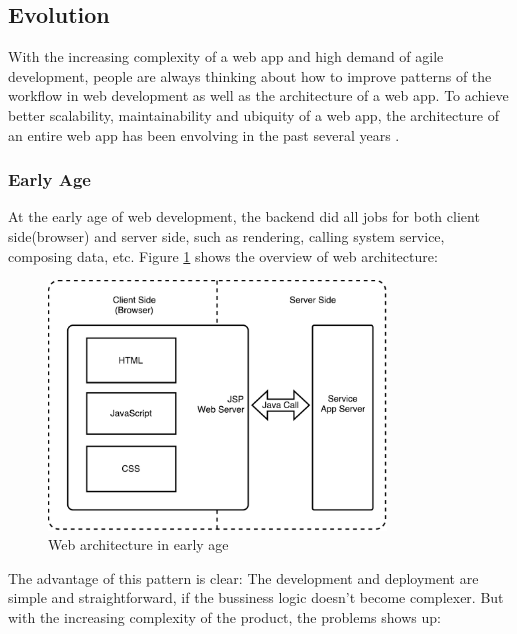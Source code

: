 

\subsection{Evolution}
With the increasing complexity of a web app and high demand of agile development, people are always thinking about how to improve patterns of the workflow in web development as well as the architecture of a web app. To achieve better scalability, maintainability and ubiquity of a web app, the architecture of an entire web app has been envolving in the past several years .

\subsubsection{Early Age}
At the early age of web development, the backend did all jobs for both client side(browser) and server side, such as rendering, calling system service, composing data, etc. Figure \ref{fig:3.1} shows the overview of web architecture:
\begin{figure}[!htbp]
  \centering
    \includegraphics[width=0.8\textwidth]{Figures/tech-web-arch-early.pdf}
  \caption{Web architecture in early age}
  \label{fig:3.1}
\end{figure}
The advantage of this pattern is clear: The development and deployment are simple and straightforward, if the bussiness logic doesn't become complexer. But with the increasing complexity of the product, the problems shows up:
